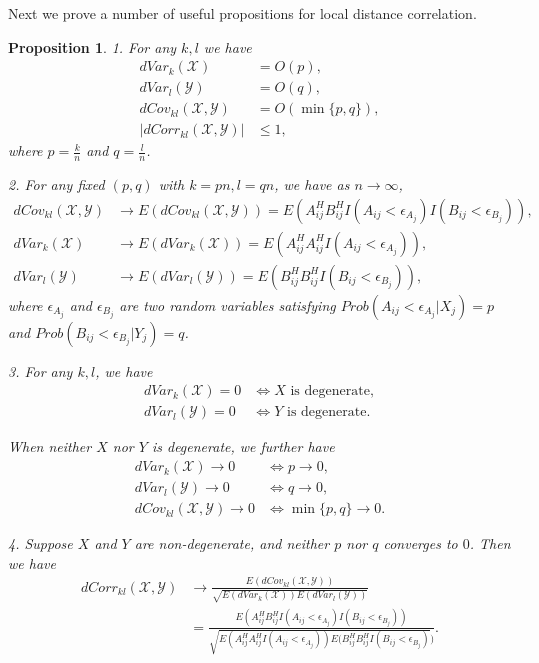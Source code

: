 \documentclass[12pt]{article}
\newtheorem{prop}{Proposition}
\begin{document}
Next we prove a number of useful propositions for local distance correlation.
\begin{prop}
\label{prop1}
1. For any $k,l$ we have
\begin{align*}
dVar_{k}(\mathcal{X}) &= O(p), \\
dVar_{l}(\mathcal{Y}) &= O(q), \\
dCov_{kl}(\mathcal{X},\mathcal{Y}) &= O(\min\{p,q\}), \\
|dCorr_{kl}(\mathcal{X},\mathcal{Y})| &\leq 1, 
\end{align*}
where $p=\frac{k}{n}$ and $q=\frac{l}{n}$. 

2.
For any fixed $(p,q)$ with $k=pn, l=qn$, we have as $n \rightarrow \infty$, 
\begin{align*}
dCov_{kl}(\mathcal{X},\mathcal{Y}) & \rightarrow E(dCov_{kl}(\mathcal{X},\mathcal{Y})) = E(A^{H}_{ij}B^{H}_{ij}I(A_{ij}< \epsilon_{A_{j}})I(B_{ij}< \epsilon_{B_{j}})), \\
dVar_{k}(\mathcal{X}) & \rightarrow E(dVar_{k}(\mathcal{X}))=E(A^{H}_{ij}A^{H}_{ij}I(A_{ij}< \epsilon_{A_{j}})), \\
dVar_{l}(\mathcal{Y}) & \rightarrow E(dVar_{l}(\mathcal{Y}))=E(B^{H}_{ij}B^{H}_{ij}I(B_{ij}< \epsilon_{B_{j}})),
\end{align*}
where $\epsilon_{A_{j}}$ and $\epsilon_{B_{j}}$ are two random variables satisfying $Prob(A_{ij}< \epsilon_{A_{j}} | X_{j})=p$ and $Prob(B_{ij}< \epsilon_{B_{j}} | Y_{j})=q$.

3. For any $k,l$, we have 
\begin{align*}
dVar_{k}(\mathcal{X})=0 &\Leftrightarrow X \mbox{ is degenerate}, \\
dVar_{l}(\mathcal{Y})=0 &\Leftrightarrow Y \mbox{ is degenerate}. 
\end{align*}

When neither $X$ nor $Y$ is degenerate, we further have 
\begin{align*}
dVar_{k}(\mathcal{X}) \rightarrow 0 &\Leftrightarrow p \rightarrow 0, \\
dVar_{l}(\mathcal{Y}) \rightarrow 0 &\Leftrightarrow q \rightarrow 0, \\
dCov_{kl}(\mathcal{X},\mathcal{Y}) \rightarrow 0 &\Leftrightarrow \min\{p,q\} \rightarrow 0.
\end{align*}

4. Suppose $X$ and $Y$ are non-degenerate, and neither $p$ nor $q$ converges to $0$. Then we have
\begin{align*}
dCorr_{kl}(\mathcal{X},\mathcal{Y}) & \rightarrow \frac{E(dCov_{kl}(\mathcal{X},\mathcal{Y}))}{\sqrt{E(dVar_{k}(\mathcal{X}))E(dVar_{l}(\mathcal{Y}))}}\\
&=\frac{E(A^{H}_{ij}B^{H}_{ij}I(A_{ij}< \epsilon_{A_{j}})I(B_{ij}< \epsilon_{B_{j}}))}{\sqrt{E(A^{H}_{ij}A^{H}_{ij}I(A_{ij}< \epsilon_{A_{j}}))E(B^{H}_{ij}B^{H}_{ij}I(B_{ij}< \epsilon_{B_{j}})})}. 
\end{align*}


\end{prop}
\end{document}
